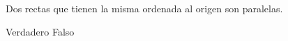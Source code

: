 Dos rectas que tienen la misma ordenada al origen son paralelas.

\begin{oneparchoices}
    \choice Verdadero
    \CorrectChoice Falso
\end{oneparchoices}